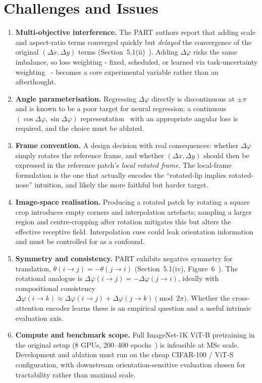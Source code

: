 \documentclass[11pt,a4paper]{article}
\begin{document}
\section{Challenges and Issues}
\begin{enumerate}[label=\textbf{C\arabic*.}]
  \item \textbf{Multi-objective interference.} The PART authors report that adding scale and aspect-ratio terms converged quickly but \emph{delayed} the convergence of the original $(\Delta x, \Delta y)$ terms (Section~5.1(ii)~\cite{part}). Adding $\Delta\varphi$ risks the same imbalance, so loss weighting - fixed, scheduled, or learned via task-uncertainty weighting~\cite{kendall} - becomes a core experimental variable rather than an afterthought.
  \item \textbf{Angle parameterisation.} Regressing $\Delta\varphi$ directly is discontinuous at $\pm\pi$ and is known to be a poor target for neural regression; a continuous $(\cos\Delta\varphi, \sin\Delta\varphi)$ representation~\cite{rotcont} with an appropriate angular loss is required, and the choice must be ablated.
  \item \textbf{Frame convention.} A design decision with real consequences: whether $\Delta\varphi$ simply rotates the reference frame, and whether $(\Delta x, \Delta y)$ should then be expressed in the reference patch's \emph{local rotated frame}. The local-frame formulation is the one that actually encodes the ``rotated-lip implies rotated-nose'' intuition, and likely the more faithful but harder target.
  \item \textbf{Image-space realisation.} Producing a rotated patch by rotating a square crop introduces empty corners and interpolation artefacts; sampling a larger region and centre-cropping after rotation mitigates this but alters the effective receptive field. Interpolation cues could leak orientation information and must be controlled for as a confound.
  \item \textbf{Symmetry and consistency.} PART exhibits negative symmetry for translation, $\theta(i{\to}j) = -\theta(j{\to}i)$ (Section~5.1(iv), Figure~6~\cite{part}). The rotational analogue is $\Delta\varphi(i{\to}j) = -\Delta\varphi(j{\to}i)$, ideally with compositional consistency $\Delta\varphi(i{\to}k) \approx \Delta\varphi(i{\to}j) + \Delta\varphi(j{\to}k) \pmod{2\pi}$. Whether the cross-attention encoder learns these is an empirical question and a useful intrinsic evaluation axis.
  \item \textbf{Compute and benchmark scope.} Full ImageNet-1K ViT-B pretraining in the original setup (8 GPUs, 200--400 epochs~\cite{part}) is infeasible at MSc scale. Development and ablation must run on the cheap CIFAR-100 / ViT-S configuration, with downstream orientation-sensitive evaluation chosen for tractability rather than maximal scale.
\end{enumerate}
\end{document}
